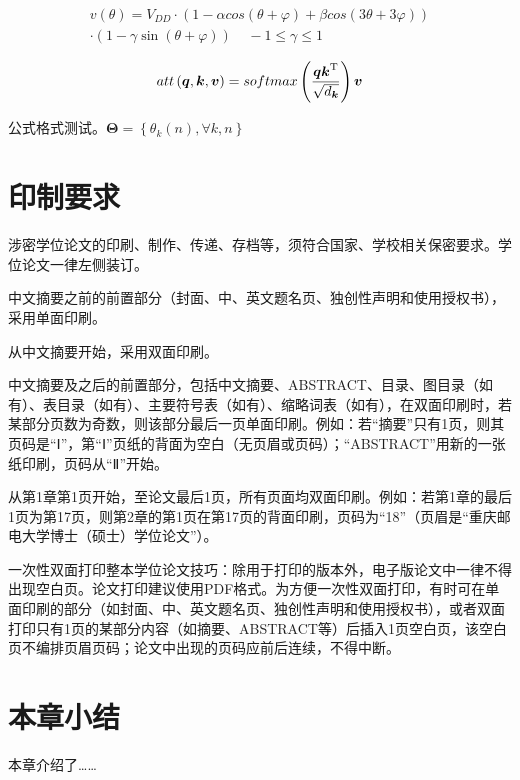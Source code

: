 \begin{equation}
\begin{aligned}
v(\theta ) = V_{DD}\cdot(1 - \alpha cos(\theta  + \varphi ) + \beta cos(3\theta  + 3\varphi ))\\
\cdot(1 - \gamma \sin (\theta  + \varphi )) ~~~~~- 1 \le \gamma  \le 1\
\end{aligned}
\label{eq:vd}
\end{equation}

\begin{equation}
\begin{aligned}
att\left( {{\bm{q}},{\bm{k}},{\bm{v}}} \right) = softmax\left( {\frac{{{\bm{qk}}^{\rm T} }}
	{{\sqrt {d_{\bm{k}} } }}} \right){\bm{v}}
\end{aligned}
\label{eq:2.12}
\end{equation}




\noindent
公式格式测试。${\mathbf{\Theta }} = \left\{ {{\theta _k}\left( n \right),\forall k,n} \right\}$

\section{印制要求}
涉密学位论文的印刷、制作、传递、存档等，须符合国家、学校相关保密要求。学位论文一律左侧装订。

中文摘要之前的前置部分（封面、中、英文题名页、独创性声明和使用授权书），采用单面印刷。

从中文摘要开始，采用双面印刷。

中文摘要及之后的前置部分，包括中文摘要、ABSTRACT、目录、图目录（如有）、表目录（如有）、主要符号表（如有）、缩略词表（如有），在双面印刷时，若某部分页数为奇数，则该部分最后一页单面印刷。例如：若“摘要”只有1页，则其页码是“Ⅰ”，第“Ⅰ”页纸的背面为空白（无页眉或页码）；“ABSTRACT”用新的一张纸印刷，页码从“Ⅱ”开始。

从第1章第1页开始，至论文最后1页，所有页面均双面印刷。例如：若第1章的最后1页为第17页，则第2章的第1页在第17页的背面印刷，页码为“18”（页眉是“重庆邮电大学博士（硕士）学位论文”）。

一次性双面打印整本学位论文技巧：除用于打印的版本外，电子版论文中一律不得出现空白页。论文打印建议使用PDF格式。为方便一次性双面打印，有时可在单面印刷的部分（如封面、中、英文题名页、独创性声明和使用授权书），或者双面打印只有1页的某部分内容（如摘要、ABSTRACT等）后插入1页空白页，该空白页不编排页眉页码；论文中出现的页码应前后连续，不得中断。


\section{本章小结}
本章介绍了……
